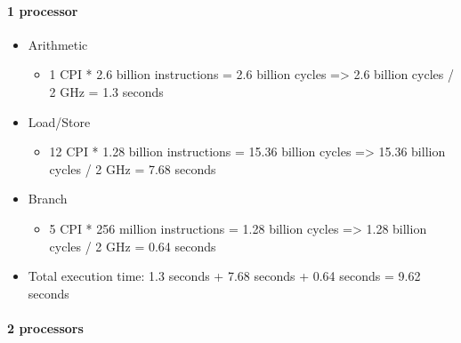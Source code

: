 \documentclass[]{article}
\let\oldparagraph\paragraph
\renewcommand{\paragraph}[1]{\oldparagraph{#1}\mbox{}}
\begin{document}
\paragraph{1 processor}\label{header-n4902}

\begin{itemize}
\item
  Arithmetic

  \begin{itemize}
  \item
    1 CPI * 2.6 billion instructions = 2.6 billion cycles
    =\textgreater{} 2.6 billion cycles / 2 GHz = 1.3 seconds
  \end{itemize}
\item
  Load/Store

  \begin{itemize}
  \item
    12 CPI * 1.28 billion instructions = 15.36 billion cycles
    =\textgreater{} 15.36 billion cycles / 2 GHz = 7.68 seconds
  \end{itemize}
\item
  Branch

  \begin{itemize}
  \item
    5 CPI * 256 million instructions = 1.28 billion cycles
    =\textgreater{} 1.28 billion cycles / 2 GHz = 0.64 seconds
  \end{itemize}
\item
  Total execution time: 1.3 seconds + 7.68 seconds + 0.64 seconds = 9.62
  seconds
\end{itemize}

\paragraph{2 processors}\label{header-n4928}
\end{document}
